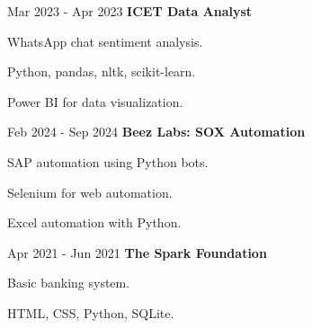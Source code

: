 \begin{twocolentry}{Mar 2023 - Apr 2023}
    \textbf{ICET Data Analyst}
\end{twocolentry}
\vspace{0.10 cm}
\begin{onecolentry}
    \begin{highlights}
        \item WhatsApp chat sentiment analysis.
        \item Python, pandas, nltk, scikit-learn.
        \item Power BI for data visualization.
    \end{highlights}
\end{onecolentry}
\vspace{0.2 cm}
\begin{twocolentry}{Feb 2024 - Sep 2024}
    \textbf{Beez Labs: SOX Automation}
\end{twocolentry}
\vspace{0.10 cm}
\begin{onecolentry}
    \begin{highlights}
        \item SAP automation using Python bots.
        \item Selenium for web automation.
        \item Excel automation with Python.
    \end{highlights}
\end{onecolentry}
\vspace{0.2 cm}
\begin{twocolentry}{Apr 2021 - Jun 2021}
    \textbf{The Spark Foundation}
\end{twocolentry}
\vspace{0.10 cm}
\begin{onecolentry}
    \begin{highlights}
        \item Basic banking system.
        \item HTML, CSS, Python, SQLite.
    \end{highlights}
\end{onecolentry}


